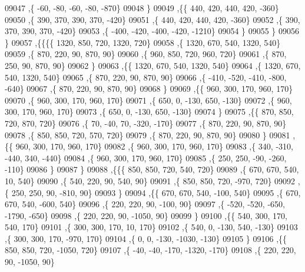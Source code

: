 \begin{DoxyCode}
09047     ,\{   -60,   -80,   -60,   -80,  -870\}
09048     \}
09049    ,\{\{   440,   420,   440,   420,  -360\}
09050     ,\{   390,   370,   390,   370,  -420\}
09051     ,\{   440,   420,   440,   420,  -360\}
09052     ,\{   390,   370,   390,   370,  -420\}
09053     ,\{  -400,  -420,  -400,  -420, -1210\}
09054     \}
09055    \}
09056   \}
09057  ,\{\{\{\{  1320,   850,   720,  1320,   720\}
09058     ,\{  1320,   670,   540,  1320,   540\}
09059     ,\{   870,   220,    90,   870,    90\}
09060     ,\{   960,   850,   720,   960,   720\}
09061     ,\{   870,   250,    90,   870,    90\}
09062     \}
09063    ,\{\{  1320,   670,   540,  1320,   540\}
09064     ,\{  1320,   670,   540,  1320,   540\}
09065     ,\{   870,   220,    90,   870,    90\}
09066     ,\{  -410,  -520,  -410,  -800,  -640\}
09067     ,\{   870,   220,    90,   870,    90\}
09068     \}
09069    ,\{\{   960,   300,   170,   960,   170\}
09070     ,\{   960,   300,   170,   960,   170\}
09071     ,\{   650,     0,  -130,   650,  -130\}
09072     ,\{   960,   300,   170,   960,   170\}
09073     ,\{   650,     0,  -130,   650,  -130\}
09074     \}
09075    ,\{\{   870,   850,   720,   870,   720\}
09076     ,\{    70,   -40,    70,  -320,  -170\}
09077     ,\{   870,   220,    90,   870,    90\}
09078     ,\{   850,   850,   720,   570,   720\}
09079     ,\{   870,   220,    90,   870,    90\}
09080     \}
09081    ,\{\{   960,   300,   170,   960,   170\}
09082     ,\{   960,   300,   170,   960,   170\}
09083     ,\{   340,  -310,  -440,   340,  -440\}
09084     ,\{   960,   300,   170,   960,   170\}
09085     ,\{   250,   250,   -90,  -260,  -110\}
09086     \}
09087    \}
09088   ,\{\{\{   850,   850,   720,   540,   720\}
09089     ,\{   670,   670,   540,    10,   540\}
09090     ,\{   540,   220,    90,   540,    90\}
09091     ,\{   850,   850,   720,  -970,   720\}
09092     ,\{   250,   250,    90,  -810,    90\}
09093     \}
09094    ,\{\{   670,   670,   540,  -100,   540\}
09095     ,\{   670,   670,   540,  -600,   540\}
09096     ,\{   220,   220,    90,  -100,    90\}
09097     ,\{  -520,  -520,  -650, -1790,  -650\}
09098     ,\{   220,   220,    90, -1050,    90\}
09099     \}
09100    ,\{\{   540,   300,   170,   540,   170\}
09101     ,\{   300,   300,   170,    10,   170\}
09102     ,\{   540,     0,  -130,   540,  -130\}
09103     ,\{   300,   300,   170,  -970,   170\}
09104     ,\{     0,     0,  -130, -1030,  -130\}
09105     \}
09106    ,\{\{   850,   850,   720, -1050,   720\}
09107     ,\{   -40,   -40,  -170, -1320,  -170\}
09108     ,\{   220,   220,    90, -1050,    90\}

\end{DoxyCode}
